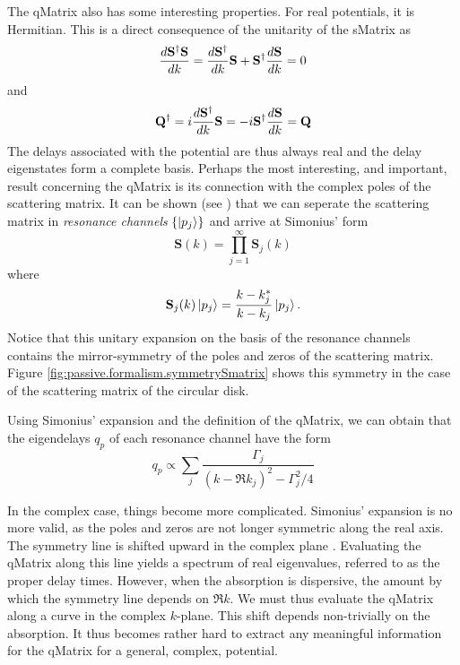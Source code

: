 The \gls{qMatrix} also has some interesting properties. For real
potentials, it is Hermitian. This is a direct consequence of the
unitarity of the \gls{sMatrix} as 
  \begin{equation}
   \frac{d\mathbf{S}^\dagger\mathbf{S}}{dk} = \frac{d\mathbf{S}^\dagger}{dk}\mathbf{S}+\mathbf{S}^\dagger\frac{d\mathbf{S}}{dk} = 0
  \end{equation}
and
  \begin{equation}
   \mathbf{Q}^\dagger = i\frac{d\mathbf{S}^\dagger}{dk}\mathbf{S} = -i\mathbf{S}^\dagger\frac{d\mathbf{S}}{dk} = \mathbf{Q}
  \end{equation}
The delays associated with the potential are thus always real
and the delay eigenstates form a complete basis. Perhaps the
most interesting, and important, result concerning the 
\gls{qMatrix} is its connection with the complex poles of the
scattering matrix. It can be shown (see \cite{SHI2011,SHI2012,GAP2013a})
that we can seperate the scattering matrix in \textit{resonance channels} $\{\ket{p_j}\}$
and arrive at Simonius' form \cite{SIM1974}
  \begin{equation}
   \mathbf{S}(k)=\prod_{j=1}^\infty \mathbf{S}_j(k)
  \end{equation}
where
  \begin{equation}
   \mathbf{S}_j(k)\Ket{p_j} = \frac{k-k_j^*}{k-k_j}\Ket{p_j}.
  \end{equation}
Notice that this unitary expansion on the basis of the resonance
channels contains the mirror-symmetry of the poles and zeros of the 
scattering matrix. Figure \ref{fig:passive.formalism.symmetrySmatrix}
shows this symmetry in the case of the scattering matrix of the circular
disk. 

Using Simonius' expansion and the definition of the \gls{qMatrix}, we can obtain that
the eigendelays $q_p$ of each resonance channel have the form
  \begin{equation}
   \label{eq:passive.formalism.lorentzianDelays}
   q_p \propto \sum_j \frac{\Gamma_j}{\left(k-\Re{k_j}\right)^2-\Gamma_j^2/4}
  \end{equation}

In the complex case, things become more complicated. Simonius' 
expansion is no more valid, as the poles and zeros are not 
longer symmetric along the real axis. The symmetry line
is shifted upward in the complex plane \cite{SAV2003,FYO2005}. 
Evaluating the \gls{qMatrix} along this line yields
a spectrum of real eigenvalues, referred to as the proper delay times. 
However, when the absorption is dispersive, the amount by which the symmetry
line depends on $\Re{k}$. We must thus evaluate the \gls{qMatrix} along
a curve in the complex $k$-plane. This shift depends non-trivially
on the absorption. It thus becomes rather hard to extract any meaningful
information for the \gls{qMatrix} for a general, complex, potential. 

